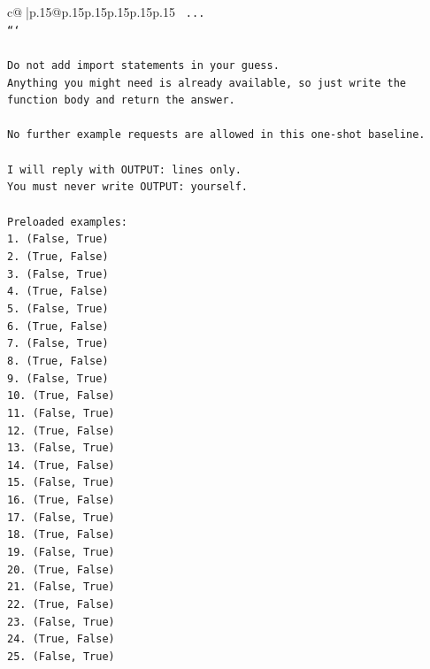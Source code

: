 \documentclass{article}
\begin{document}
{\begin{supertabular}{c@{$\;$}|p{.15\linewidth}@{}p{.15\linewidth}p{.15\linewidth}p{.15\linewidth}p{.15\linewidth}p{.15\linewidth}}
{{{\texttt{    ...} \\
\texttt{```} \\
\\ 
\texttt{Do not add import statements in your guess.} \\
\texttt{Anything you might need is already available, so just write the function body and return the answer.} \\
\\ 
\texttt{No further example requests are allowed in this one{-}shot baseline.} \\
\\ 
\texttt{I will reply with OUTPUT: lines only.} \\
\texttt{You must never write OUTPUT: yourself.} \\
\\ 
\texttt{Preloaded examples:} \\
\texttt{1. (False, True)} \\
\texttt{2. (True, False)} \\
\texttt{3. (False, True)} \\
\texttt{4. (True, False)} \\
\texttt{5. (False, True)} \\
\texttt{6. (True, False)} \\
\texttt{7. (False, True)} \\
\texttt{8. (True, False)} \\
\texttt{9. (False, True)} \\
\texttt{10. (True, False)} \\
\texttt{11. (False, True)} \\
\texttt{12. (True, False)} \\
\texttt{13. (False, True)} \\
\texttt{14. (True, False)} \\
\texttt{15. (False, True)} \\
\texttt{16. (True, False)} \\
\texttt{17. (False, True)} \\
\texttt{18. (True, False)} \\
\texttt{19. (False, True)} \\
\texttt{20. (True, False)} \\
\texttt{21. (False, True)} \\
\texttt{22. (True, False)} \\
\texttt{23. (False, True)} \\
\texttt{24. (True, False)} \\
\texttt{25. (False, True)} \\
}}}
\end{supertabular}}
\end{document}
